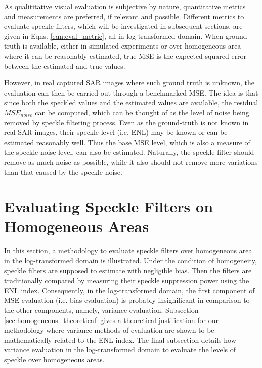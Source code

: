 \documentclass[journal]{IEEEtran}
\begin{document}
As qualititative visual evaluation is subjective by nature,
	quantitative metrics and measurements are preferred, if relevant and possible.
Different metrics to evaluate speckle filters, which will be investigated in subsequent sections, 
are given in Eqns. \ref{eqn:eval_metric}, all in log-transformed domain.
When ground-truth is available, 
	either in simulated experiments or over homogeneous area where it can be reasonably estimated, 
	true MSE is the expected squared error between the estimated and true values.

However, in real captured SAR images where such ground truth is unknown, the evaluation can then be carried out 
through a benchmarked MSE. 
The idea is that since both the speckled values and the estimated values are available, the residual $MSE_{noise}$ 
can be computed, which can be thought of as the level of noise being removed by speckle filtering process.
Even as the ground-truth is not known in real SAR images, their speckle level (i.e. ENL) may be known or can be 
estimated reasonably well.
Thus the base MSE level, which is also a measure of the speckle noise level, can also be estimated.
Naturally, the speckle filter should remove as much noise as possible, 
	while it also should not remove more variations than that caused by the speckle noise.

\section{Evaluating Speckle Filters on Homogeneous Areas}
\label{sec:eval_homo}

In this section, a methodology to evaluate speckle filters over homogeneous area in the log-transformed domain is 
illustrated. Under the condition of homogeneity, speckle filters are supposed to estimate with negligible bias.
Then the filters are traditionally compared by measuring their speckle suppression power using the ENL index.
Consequently, in the log-transformed domain, the first component of MSE evaluation (i.e. bias evaluation) is 
probably insignificant in comparison to the other components, namely, variance evaluation. 
Subsection \ref{sec:homogeneous_theoretical} gives a theoretical justification for our methodology where variance 
methods of evaluation are shown to be mathematically related to the ENL index.
The final subsection details how variance evaluation in the log-transformed domain to evaluate the levels of speckle 
over homogeneous areas.
\end{document}
